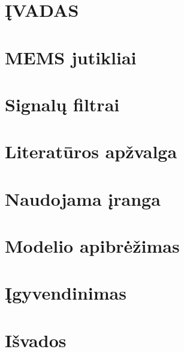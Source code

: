\documentclass[]{vgtuef}
\begin{document}
  

  \section*{ĮVADAS}

  

  \section{MEMS jutikliai}

  

  \section{Signalų filtrai}

  

  \section{Literatūros apžvalga}

  

  \section{Naudojama įranga}

  

  \section{Modelio apibrėžimas}

  

  \section{Įgyvendinimas}

  

  \newpage

  \section*{Išvados}

  

  \newpage


  
  
\end{document}
